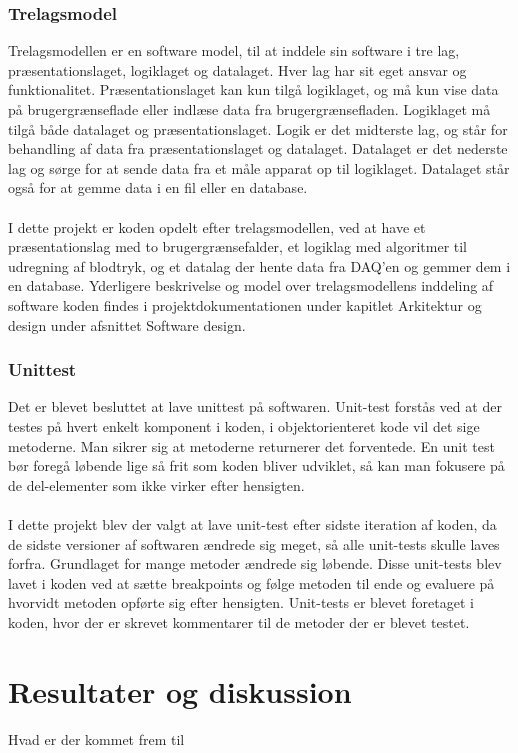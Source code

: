 \subsubsection{Trelagsmodel}
Trelagsmodellen er en software model, til at inddele sin software i tre lag, præsentationslaget, logiklaget og datalaget. Hver lag har sit eget ansvar og funktionalitet. Præsentationslaget kan kun tilgå logiklaget, og må kun vise data på brugergrænseflade eller indlæse data fra brugergrænsefladen. Logiklaget må tilgå både datalaget og præsentationslaget. Logik er det midterste lag, og står for behandling af data fra præsentationslaget og datalaget. Datalaget er det nederste lag og sørge for at sende data fra et måle apparat op til logiklaget. Datalaget står også for at gemme data i en fil eller en database.\\
\\ 
I dette projekt er koden opdelt efter trelagsmodellen, ved at have et præsentationslag med to brugergrænsefalder, et logiklag med algoritmer til udregning af blodtryk, og et datalag der hente data fra DAQ’en og gemmer dem i en database.  Yderligere beskrivelse og model over trelagsmodellens inddeling af software koden findes i projektdokumentationen under kapitlet Arkitektur og design under afsnittet Software design. 
\subsubsection{Unittest}
Det er blevet besluttet at lave unittest på softwaren. Unit-test forstås ved at der testes på hvert enkelt komponent i koden, i objektorienteret kode vil det sige metoderne. Man sikrer sig at metoderne returnerer det forventede. En unit test bør foregå løbende lige så frit som koden bliver udviklet, så kan man fokusere på de del-elementer som ikke virker efter hensigten. \\
\\
I dette projekt blev der valgt at lave unit-test efter sidste iteration af koden, da de sidste versioner af softwaren ændrede sig meget, så alle unit-tests skulle laves forfra. Grundlaget for mange metoder ændrede sig løbende. Disse unit-tests blev lavet i koden ved at sætte breakpoints og følge metoden til ende og evaluere på hvorvidt metoden opførte sig efter hensigten. Unit-tests er blevet foretaget i koden, hvor der er skrevet kommentarer til de metoder der er blevet testet.
\section{Resultater og diskussion}
Hvad er der kommet frem til
